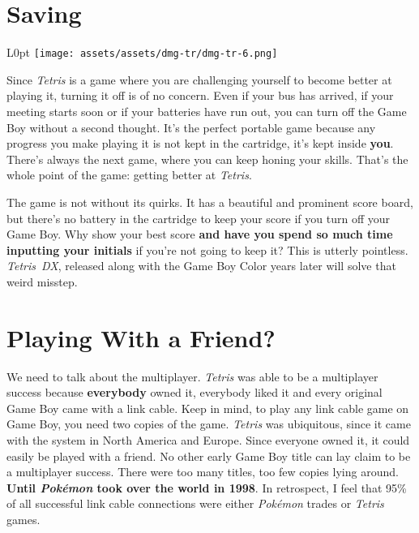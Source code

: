 \documentclass{book}
\begin{document}
\FloatBarrier\needspace{10mm}\section*{Saving}\nopagebreak[4]

\begin{wrapfigure}{L}{0pt} \texttt{[image: assets/assets/dmg-tr/dmg-tr-6.png]}\end{wrapfigure}
Since \emph{Tetris} is a game where you are challenging yourself to become better at playing it, turning it off is of no concern. Even if your bus has arrived, if your meeting starts soon or if your batteries have run out, you can turn off the Game Boy without a second thought. It’s the perfect portable game because any progress you make playing it is not kept in the cartridge, it’s kept inside \textbf{you}. There’s always the next game, where you can keep honing your skills. That’s the whole point of the game: getting better at \emph{Tetris}.

The game is not without its quirks. It has a beautiful and prominent score board, but there’s no battery in the cartridge to keep your score if you turn off your Game Boy. Why show your best score \textbf{and have you spend so much time inputting your initials} if you’re not going to keep it? This is utterly pointless. \emph{Tetris~DX}, released along with the Game Boy Color years later will solve that weird misstep.

\FloatBarrier\needspace{10mm}\section*{Playing With a Friend?}\nopagebreak[4]

We need to talk about the multiplayer. \emph{Tetris} was able to be a multiplayer success because \textbf{everybody} owned it, everybody liked it and every original Game Boy came with a link cable. Keep in mind, to play any link cable game on Game Boy, you need two copies of the game. \emph{Tetris} was ubiquitous, since it came with the system in North America and Europe. Since everyone owned it, it could easily be played with a friend. No other early Game Boy title can lay claim to be a multiplayer success. There were too many titles, too few copies lying around. \textbf{Until \emph{Pokémon} took over the world in 1998}. In retrospect, I feel that 95\% of all successful link cable connections were either \emph{Pokémon} trades or \emph{Tetris} games.
\end{document}
